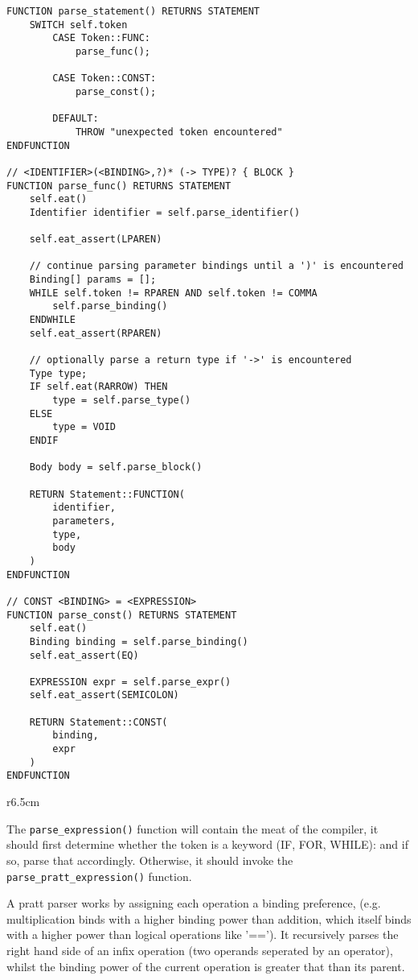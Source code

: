 \begin{lstlisting}
FUNCTION parse_statement() RETURNS STATEMENT
    SWITCH self.token 
        CASE Token::FUNC:
            parse_func();

        CASE Token::CONST:
            parse_const();

        DEFAULT:
            THROW "unexpected token encountered"
ENDFUNCTION

// <IDENTIFIER>(<BINDING>,?)* (-> TYPE)? { BLOCK }
FUNCTION parse_func() RETURNS STATEMENT 
    self.eat()
    Identifier identifier = self.parse_identifier()

    self.eat_assert(LPAREN)

    // continue parsing parameter bindings until a ')' is encountered
    Binding[] params = [];
    WHILE self.token != RPAREN AND self.token != COMMA 
        self.parse_binding()
    ENDWHILE
    self.eat_assert(RPAREN)
    
    // optionally parse a return type if '->' is encountered
    Type type;
    IF self.eat(RARROW) THEN
        type = self.parse_type()
    ELSE
        type = VOID
    ENDIF

    Body body = self.parse_block()

    RETURN Statement::FUNCTION(
        identifier,
        parameters,
        type,
        body
    )
ENDFUNCTION

// CONST <BINDING> = <EXPRESSION>
FUNCTION parse_const() RETURNS STATEMENT
    self.eat()
    Binding binding = self.parse_binding()
    self.eat_assert(EQ)

    EXPRESSION expr = self.parse_expr()
    self.eat_assert(SEMICOLON)

    RETURN Statement::CONST(
        binding, 
        expr
    )
ENDFUNCTION
\end{lstlisting}

\begin{wrapfigure}[24]{r}{6.5cm}
\end{wrapfigure}

The \texttt{parse\_expression()} function will contain the meat of the compiler, it should first determine whether the token is a keyword (IF, FOR, WHILE): and if so, parse that accordingly. Otherwise, it should invoke the \texttt{parse\_pratt\_expression()} function. 

A pratt parser works by assigning each operation a binding preference, (e.g. multiplication binds with a higher binding power than addition, which itself binds with a higher power than logical operations like '=='). It recursively parses the right hand side of an infix operation (two operands seperated by an operator), whilst the binding power of the current operation is greater that than its parent. 

